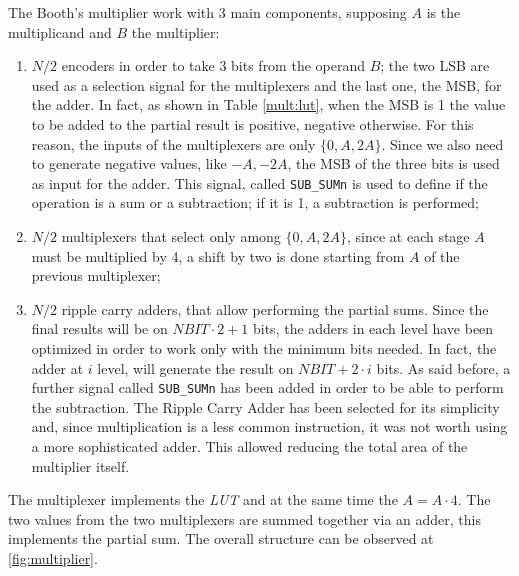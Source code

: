 The Booth's multiplier work with 3 main components, supposing $A$ is the multiplicand and $B$ the multiplier:
\begin{enumerate}
    \item $N/2$ encoders in order to take 3 bits from the operand $B$; the two LSB are used as a selection signal for the multiplexers and the last one, the MSB, for the adder. In fact, as shown in Table \ref{mult:lut}, when the MSB is 1 the value to be added to the partial result is positive, negative otherwise. For this reason, the inputs of the multiplexers are only $\{0, A, 2A\}$. Since we also need to generate negative values, like ${-A, -2A}$, the MSB of the three bits is used as input for the adder. This signal, called \texttt{SUB\_SUMn} is used to define if the operation is a sum or a subtraction; if it is 1, a subtraction is performed;
    \item $N/2$ multiplexers that select only among $\{0, A, 2A\}$, since at each stage $A$ must be multiplied by 4, a shift by two is done starting from $A$ of the previous multiplexer;
    \item $N/2$ ripple carry adders, that allow performing the partial sums. Since the final results will be on $NBIT \cdot 2+1$ bits, the adders in each level have been optimized in order to work only with the minimum bits needed. In fact, the adder at $i$ level, will generate the result on $NBIT + 2 \cdot i$ bits. As said before, a further signal called \texttt{SUB\_SUMn} has been added in order to be able to perform the subtraction. The Ripple Carry Adder has been selected for its simplicity and, since multiplication is a less common instruction, it was not worth using a more sophisticated adder. This allowed reducing the total area of the multiplier itself.
\end{enumerate}
The multiplexer implements the \textit{LUT} and at the same time the $A = A \cdot 4$. The two values from the two multiplexers are summed together via an adder, this implements the partial sum. The overall structure can be observed at \ref{fig:multiplier}.

